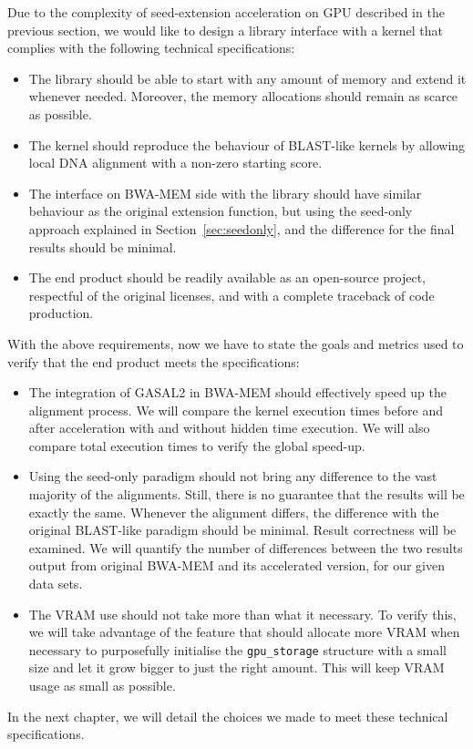 Due to the complexity of seed-extension acceleration on GPU described in the previous section, we would like to design a library interface with a kernel that complies with the following technical specifications:

\begin{itemize}
	\item The library should be able to start with any amount of memory and extend it whenever needed. Moreover, the memory allocations should remain as scarce as possible.
	\item The kernel should reproduce the behaviour of BLAST-like kernels by allowing local DNA alignment with a non-zero starting score.
	\item The interface on BWA-MEM side with the library should have similar behaviour as the original extension function, but using the seed-only approach explained in Section~\ref{sec:seedonly}, and the difference for the final results should be minimal.
	\item The end product should be readily available as an open-source project, respectful of the original licenses, and with a complete traceback of code production.
\end{itemize}

With the above requirements, now we have to state the goals and metrics used to verify that the end product meets the specifications:
\begin{itemize}
	\item The integration of GASAL2 in BWA-MEM should effectively speed up the alignment process. We will compare the kernel execution times before and after acceleration  with and without hidden time execution. We will also compare total execution times to verify the global speed-up.
	
	\item Using the seed-only paradigm should not bring any difference to the vast majority of the alignments. Still, there is no guarantee that the results will be exactly the same. Whenever the alignment differs, the difference with the original BLAST-like paradigm should be minimal. Result correctness will be examined. We will quantify the number of differences between the two results output from original BWA-MEM and its accelerated version, for our given data sets.
	
	\item The VRAM use should not take more than what it necessary. To verify this, we will take advantage of the feature that should allocate more VRAM when necessary to purposefully initialise the \verb|gpu_storage| structure with a small size and let it grow bigger to just the right amount. This will keep VRAM usage as small as possible.
	
\end{itemize}

In the next chapter, we will detail the choices we made to meet these technical specifications.